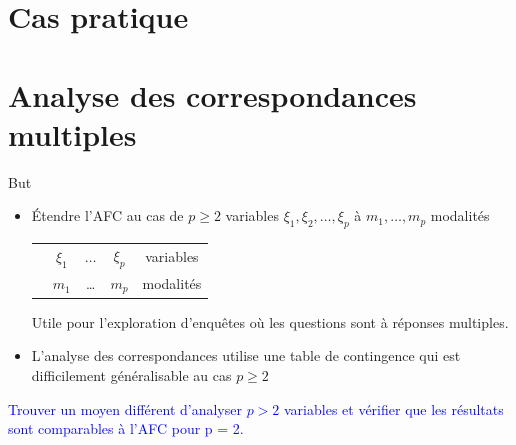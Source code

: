 \documentclass[12pt]{beamer}
\begin{document}
\section{Cas pratique}
\begin{frame}{}

\end{frame}



\section{Analyse des correspondances multiples}


\begin{frame}{ But}
\begin{itemize}
\item Étendre l'AFC au cas de $p \geq 2$ variables  $\xi_1, \xi_2,  \ldots, \xi_p$ à   $ m_1, \ldots, m_p $ modalités\\

\begin{table}
\begin{tabular}{ccccc}

 & $\xi_1$& $\ldots$ & $ \xi_p$& variables \\
 & $m_1$ & \ldots  &$m_p$ & modalités 
 
\end{tabular} 
\end{table}

 Utile pour l'exploration d'enquêtes où les questions sont à réponses multiples.\\
\item L’analyse des correspondances utilise une table
de contingence qui est difficilement généralisable au cas
$p \geq 2$ 
\end{itemize}

\textcolor{blue}{Trouver un moyen différent d'analyser $p > 2$
variables et vérifier que les résultats sont comparables à l’AFC pour p = 2.}
 

\end{frame}


\end{document}
